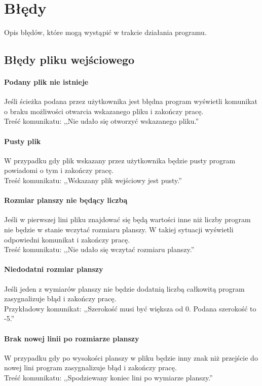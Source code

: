 \documentclass{report}
\begin{document}
\section{Błędy}
Opis błędów, które mogą wystąpić w trakcie działania programu.

\subsection{Błędy pliku wejściowego}

\paragraph{Podany plik nie istnieje}
Jeśli ścieżka podana przez użytkownika jest błędna program wyświetli komunikat o braku możliwości otwarcia wskazanego pliku i zakończy pracę. \\
Treść komunikatu: ,,Nie udało się otworzyć wskazanego pliku.''

\paragraph{Pusty plik}
W przypadku gdy plik wskazany przez użytkownika będzie pusty program powiadomi o tym i zakończy pracę. \\
Treść komunikatu: ,,Wskazany plik wejściowy jest pusty.''

\paragraph{Rozmiar planszy nie będący liczbą}
Jeśli w pierwszej lini pliku znajdować się będą wartości inne niż liczby program nie będzie w stanie wczytać rozmiaru planszy. W takiej sytuacji wyświetli odpowiedni komunikat i zakończy pracę. \\
 Treść komunikatu: ,,Nie udało się wczytać rozmiaru planszy.''
 
 \paragraph{Niedodatni rozmiar planszy}
 Jeśli jeden z wymiarów planszy nie będzie dodatnią liczbą całkowitą program zasygnalizuje błąd i zakończy pracę. \\
 Przykładowy komunikat: ,,Szerokość musi być większa od 0. Podana szerokość to -5.''
 
 \paragraph{Brak nowej linii po rozmiarze planszy}
 W przypadku gdy po wysokości planszy w pliku będzie inny znak niż przejście do nowej lini program zasygnalizuje błąd i zakończy pracę. \\
 Treść komunikatu: ,,Spodziewany koniec lini po wymiarze planszy.''
 
\end{document}
